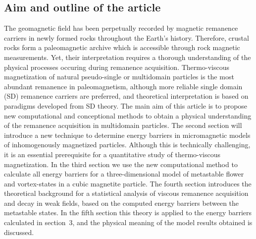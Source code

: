 \subsection{Aim and outline of the article}

The geomagnetic field has been perpetually recorded by magnetic remanence
carriers in newly formed rocks throughout the Earth's history.
%
Therefore,
crustal rocks form a paleomagnetic archive which is accessible  through
 rock magnetic measurements.
 Yet, their interpretation requires a thorough understanding of
the physical processes occuring during  remanence acquisition.
%
Thermo-viscous magnetization of natural pseudo-single or multidomain
particles is   the most abundant
remanence  in paleomagnetism, although
more reliable single domain (SD) remanence carriers are preferred, and theoretical interpretation
is based on paradigms developed from SD theory.
The main aim of this article is to propose new computational and conceptional
methods to obtain a physical understanding of the remanence acquisition in
multidomain particles.
The second section will introduce a new technique to determine energy barriers in
micromagnetic models of inhomogenously magnetized particles.
Although this is technically challenging, it is an essential prerequisite
for a quantitative study of thermo-viscous magnetization.
In the third section we use the new computational method to calculate all energy barriers for a
three-dimensional model of metastable flower and vortex-states in a cubic magnetite particle.
The fourth section introduces the theoretical background for a statistical analysis  of viscous
remanence acquisition and decay in weak fields, based on the computed
energy barriers between the metastable states.
In the fifth section this theory is applied to the energy barriers calculated in section~3, and
the physical meaning of the model results obtained is discussed.

